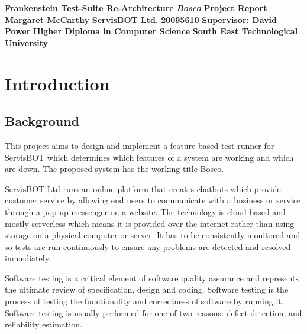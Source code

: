 \documentclass[12pt,a4paper,titlepage]{report}
\newcommand\AcademicTitle{Frankenstein Test-Suite Re-Architecture}
\newcommand\CommericalTitle{Bosco}
\newcommand\Author{Margaret McCarthy}
\newcommand\StudentID{20095610}
\newcommand\Report{Project Report}
\newcommand\Stakeholder{ServisBOT Ltd.}
\newcommand\Course{Higher Diploma in Computer Science}
\newcommand\Reader{Supervisor: David Power}
\newcommand\University{South East Technological University}
\begin{document}

\thispagestyle{empty}
\begin{center}
 \mbox{}\vfill
 {\fontsize{17pt}{20pt}\selectfont \bfseries \AcademicTitle}
 \vfill
 {\fontsize{14pt}{20pt}\selectfont \bfseries\itshape\CommericalTitle}
 \vfill
 {\fontsize{12pt}{20pt}\selectfont \bfseries \Report}
 \vfill
 {\fontsize{14pt}{20pt}\selectfont \bfseries \Author}
 \vfill
 {\fontsize{14pt}{20pt}\selectfont \bfseries \Stakeholder}
 \vfill
 {\fontsize{14pt}{20pt}\selectfont \bfseries \StudentID}
 \vfill
 {\fontsize{14pt}{20pt}\selectfont \bfseries \Reader}
 \vfill
 {\fontsize{14pt}{20pt}\selectfont \bfseries \Course}
 \vfill
 {\fontsize{14pt}{20pt}\selectfont \bfseries \University}
 \vfill
\end{center}
\clearpage

\tableofcontents

\listoftables

\listoffigures

\clearpage
{}
\setcounter{page}{1}

\chapter{Introduction}

\section{Background}

This project aims to design and implement a feature based test runner for ServisBOT which determines which features of a system are working and which are down. The proposed system has the working title Bosco.

ServisBOT Ltd runs an online platform that creates chatbots which provide customer service by allowing end users to communicate with a business or service through a pop up messenger on a website. The technology is cloud based and mostly serverless which means it is provided over the internet rather than using storage on a physical computer or server. It has to be consistently monitored and so tests are run continuously to ensure any problems are detected and resolved immediately. 

Software testing is a critical element of software quality assurance and represents the ultimate review of specification, design and coding. Software testing is the process of testing the functionality and correctness of software by running it. Software testing is usually performed for one of two reasons: defect detection, and reliability estimation.\autocite[1]{arXiv.org}
\end{document}
